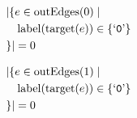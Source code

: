 \begin{align*}
&|\{e \in \mathrm{outEdges}(0)  \mid \\
&\quad \mathrm{label}(\mathrm{target}(e)) \in \{ \text{`\texttt{0}'} \}\\
&\}| = 0
\end{align*}

\begin{align*}
&|\{e \in \mathrm{outEdges}(1)  \mid \\
&\quad \mathrm{label}(\mathrm{target}(e)) \in \{ \text{`\texttt{0}'} \}\\
&\}| = 0
\end{align*}

